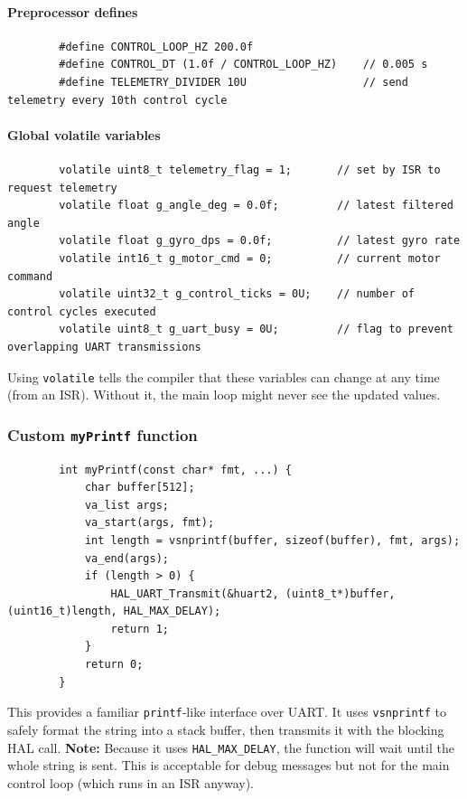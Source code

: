 \documentclass[12pt,a4paper]{article}
\newcommand{\func}[1]{\texttt{#1}}
\begin{document}
	\paragraph*{Preprocessor defines}
	\begin{lstlisting}
		#define CONTROL_LOOP_HZ 200.0f
		#define CONTROL_DT (1.0f / CONTROL_LOOP_HZ)    // 0.005 s
		#define TELEMETRY_DIVIDER 10U                  // send telemetry every 10th control cycle
	\end{lstlisting}
	
	\paragraph*{Global volatile variables}
	\begin{lstlisting}
		volatile uint8_t telemetry_flag = 1;       // set by ISR to request telemetry
		volatile float g_angle_deg = 0.0f;         // latest filtered angle
		volatile float g_gyro_dps = 0.0f;          // latest gyro rate
		volatile int16_t g_motor_cmd = 0;          // current motor command
		volatile uint32_t g_control_ticks = 0U;    // number of control cycles executed
		volatile uint8_t g_uart_busy = 0U;         // flag to prevent overlapping UART transmissions
	\end{lstlisting}
	Using \texttt{volatile} tells the compiler that these variables can change at any time (from an ISR). Without it, the main loop might never see the updated values.
	
	\newpage
	
	\subsubsection*{Custom \func{myPrintf} function}
	\begin{lstlisting}
		int myPrintf(const char* fmt, ...) {
			char buffer[512];
			va_list args;
			va_start(args, fmt);
			int length = vsnprintf(buffer, sizeof(buffer), fmt, args);
			va_end(args);
			if (length > 0) {
				HAL_UART_Transmit(&huart2, (uint8_t*)buffer, (uint16_t)length, HAL_MAX_DELAY);
				return 1;
			}
			return 0;
		}
	\end{lstlisting}
	This provides a familiar \texttt{printf}‑like interface over UART. It uses \texttt{vsnprintf} to safely format the string into a stack buffer, then transmits it with the blocking HAL call.  
	\textbf{Note:} Because it uses \texttt{HAL\_MAX\_DELAY}, the function will wait until the whole string is sent. This is acceptable for debug messages but not for the main control loop (which runs in an ISR anyway).
	
\end{document}

